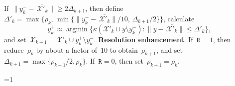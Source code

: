 \documentclass[11pt,a4paper,draft]{article}  %
\newcommand{\bibfile}{\jobname.bib}  %
\newcommand{\iscite}{0}  %
\theoremstyle{definition}
\numberwithin{equation}{section}
\newcommand{\mbar}[1]{\,\overline{\!\!{#1}\!}} %
\DeclareMathOperator*{\argmin}{argmin}
\newcommand{\redrho}{\mathtt{R}}
\newcommand{\Int}{\mathcal{X}}
\newcommand{\sss}[1]{{\scriptscriptstyle{#1}}}
\newcommand{\get}{{\sss{+}}}
\newcommand{\drop}{{\sss{-}}}
\begin{document}
\begin{algorithm}[htbp!]
\begin{algorithmic}[1]
\begin{equation}
          \end{equation}
          If~$\|y_k^{\drop}-\mbar{\Int'_k}\| \ge 2\Delta_{k+1}$, then
          define~$\Delta'_k = \max\{\rho_k,\, \min\{\|y_k^{\drop} - \mbar{\Int'_k}\|/10,\, \Delta_{k+1}/2\}\}$,
          calculate
          \begin{equation}
              \label{eq:ygetn}
              y_k^\get \approx \argmin\{\kappa(\Int'_k \cup y \setminus y_k^\drop) \mathrel{:}
              \|y-\mbar{\Int'_k}\|\le \Delta'_k\},
          \end{equation}
          and set~$\Int_{k+1} = \Int'_k\cup y_k^\get\setminus y_k^\drop$.
       \State \textbf{Resolution enhancement}.
       If~$\redrho = 1$, then reduce~$\rho_k$ by about a factor of~$10$ to
       obtain~$\rho_{k+1}$, and set~$\Delta_{k+1} = \max\{\rho_{k+1}/2, \rho_k\}$.
       If~$\redrho = 0$, then set~$\rho_{k+1} = \rho_k$.
    \end{algorithmic}
\end{algorithm}


\ifnum\iscite=1
    \small
    
    
\fi

\end{document}
